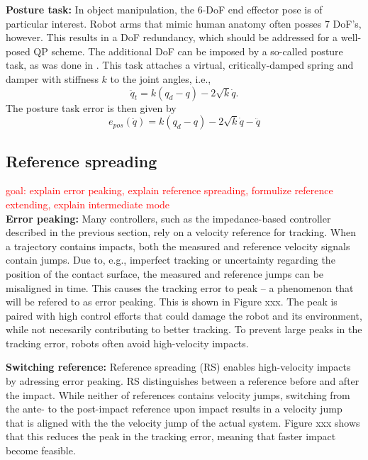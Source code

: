 \documentclass[a4paper, 10pt, conference]{ieeeconf}
\begin{document}
    \textbf{Posture task:} In object manipulation, the 6-DoF end effector pose is of particular interest. Robot arms that mimic human anatomy often posses 7 DoF's, however. This results in a DoF redundancy, which should be addressed for a well-posed QP scheme. The additional DoF can be imposed by a so-called posture task, as was done in \cite{vanoorschotDesignNumericalValidation2022}. This task attaches a virtual, critically-damped spring and damper with stiffness $k$ to the joint angles, i.e.,
    \begin{equation}
    \ddot{q}_t = k (q_d-q) - 2\sqrt{k}\dot{q}.
    \end{equation}
    The posture task error is then given by
            \begin{equation} \label{eq:e_pos} e_{pos}(\ddot{q}) = 
    k (q_d-q) - 2\sqrt{k}\dot{q} -\ddot{q}
    \end{equation}


    \subsection{Reference spreading}
     \textcolor{red}{goal: explain error peaking, explain reference spreading, formulize reference extending, explain intermediate mode }\\
    \textbf{Error peaking:} Many controllers, such as the impedance-based controller described in the previous section, rely on a velocity reference for tracking. When a trajectory contains impacts, both the measured and reference velocity signals contain jumps. Due to, e.g., imperfect tracking or uncertainty regarding the position of the contact surface, the measured and reference jumps can be misaligned in time. This causes the tracking error to peak -- a phenomenon that will be refered to as error peaking. This is shown in Figure xxx. The peak is paired with high control efforts that could damage the robot and its environment, while not necesarily contributing to better tracking. To prevent large peaks in the tracking error, robots often avoid high-velocity impacts.

    \textbf{Switching reference:} Reference spreading (RS) enables high-velocity impacts by adressing error peaking. RS distinguishes between a reference before and after the impact. While neither of references contains velocity jumps, switching from the ante- to the post-impact reference upon impact results in a velocity jump that is aligned with the the velocity jump of the actual system. Figure xxx shows that this reduces the peak in the tracking error, meaning that faster impact become feasible.
\end{document}
